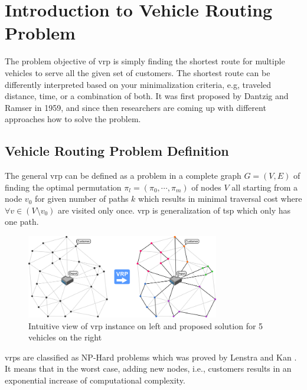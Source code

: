 \chapter{Introduction to Vehicle Routing Problem}\label{introduction_vrp}

    The problem objective of \gls{vrp} is simply finding the shortest route for multiple vehicles to serve all the given set of customers. The shortest route can be differently interpreted based on your minimalization criteria, e.g, traveled distance, time, or a combination of both. It was first proposed by Dantzig and Ramser \cite{truck-dispatching-problem} in 1959, and since then researchers are coming up with different approaches how to solve the problem. 

    \section{Vehicle Routing Problem Definition}
    
    The general \gls{vrp} can be defined as a problem in a complete graph $G=(V,E)$ of finding the optimal permutation $\pi_l = (\pi_0, \cdots, \pi_m)$ of nodes $V$ all starting from a node $v_0$ for given number of paths $k$ which results in minimal traversal cost where $\forall v \in (V \setminus v_0)$ are visited only once. \gls{vrp} is generalization of \gls{tsp} which only has one path.
    
    \begin{figure}[ht]
        \centering
        \includegraphics[width=0.75\textwidth]{resources/intro/vrp-graph.png}
        \caption{Intuitive view of \gls{vrp} instance on left and proposed solution for 5 vehicles on the right \cite{vrp-malaga}}
        \label{fig:vrp-graph}
    \end{figure}
    
    \gls{vrp}s are classified as NP-Hard problems which was proved by Lenstra and Kan \cite{time-complexity-vrp}. It means that in the worst case, adding new nodes, i.e., customers results in an exponential increase of computational complexity.
    
